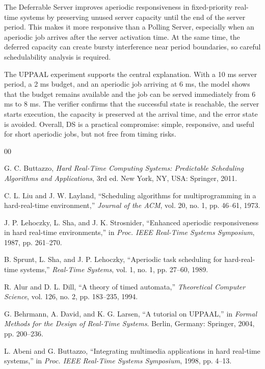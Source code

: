 \documentclass[conference]{IEEEtran}
\begin{document}
	The Deferrable Server improves aperiodic responsiveness in fixed-priority real-time systems by preserving unused server capacity until the end of the server period. This makes it more responsive than a Polling Server, especially when an aperiodic job arrives after the server activation time. At the same time, the deferred capacity can create bursty interference near period boundaries, so careful schedulability analysis is required.
	
	The UPPAAL experiment supports the central explanation. With a 10 ms server period, a 2 ms budget, and an aperiodic job arriving at 6 ms, the model shows that the budget remains available and the job can be served immediately from 6 ms to 8 ms. The verifier confirms that the successful state is reachable, the server starts execution, the capacity is preserved at the arrival time, and the error state is avoided. Overall, DS is a practical compromise: simple, responsive, and useful for short aperiodic jobs, but not free from timing risks.
	
	\begin{thebibliography}{00}
		
		G. C. Buttazzo, \textit{Hard Real-Time Computing Systems: Predictable Scheduling Algorithms and Applications}, 3rd ed. New York, NY, USA: Springer, 2011.
		
		C. L. Liu and J. W. Layland, ``Scheduling algorithms for multiprogramming in a hard-real-time environment,'' \textit{Journal of the ACM}, vol. 20, no. 1, pp. 46--61, 1973.
		
		J. P. Lehoczky, L. Sha, and J. K. Strosnider, ``Enhanced aperiodic responsiveness in hard real-time environments,'' in \textit{Proc. IEEE Real-Time Systems Symposium}, 1987, pp. 261--270.
		
		B. Sprunt, L. Sha, and J. P. Lehoczky, ``Aperiodic task scheduling for hard-real-time systems,'' \textit{Real-Time Systems}, vol. 1, no. 1, pp. 27--60, 1989.
		
		R. Alur and D. L. Dill, ``A theory of timed automata,'' \textit{Theoretical Computer Science}, vol. 126, no. 2, pp. 183--235, 1994.
		
		G. Behrmann, A. David, and K. G. Larsen, ``A tutorial on UPPAAL,'' in \textit{Formal Methods for the Design of Real-Time Systems}. Berlin, Germany: Springer, 2004, pp. 200--236.
		
		L. Abeni and G. Buttazzo, ``Integrating multimedia applications in hard real-time systems,'' in \textit{Proc. IEEE Real-Time Systems Symposium}, 1998, pp. 4--13.
		
	\end{thebibliography}
	
\end{document}
